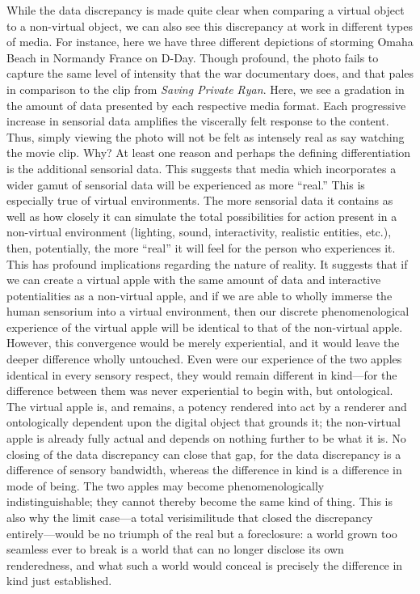 \documentclass{article}
\begin{document}
While the data discrepancy is made quite clear when comparing a virtual object to a non-virtual object, we can also see this discrepancy at work in different types of media. For instance, here we have three different depictions of storming Omaha Beach in Normandy France on D-Day. Though profound, the photo fails to capture the same level of intensity that the war documentary does, and that pales in comparison to the clip from \textit{Saving Private Ryan}. Here, we see a gradation in the amount of data presented by each respective media format. Each progressive increase in sensorial data amplifies the viscerally felt response to the content. Thus, simply viewing the photo will not be felt as intensely real as say watching the movie clip. Why? At least one reason and perhaps the defining differentiation is the additional sensorial data. This suggests that media which incorporates a wider gamut of sensorial data will be experienced as more ``real.'' This is especially true of virtual environments. The more sensorial data it contains as well as how closely it can simulate the total possibilities for action present in a non-virtual environment (lighting, sound, interactivity, realistic entities, etc.), then, potentially, the more ``real'' it will feel for the person who experiences it. This has profound implications regarding the nature of reality. It suggests that if we can create a virtual apple with the same amount of data and interactive potentialities as a non-virtual apple, and if we are able to wholly immerse the human sensorium into a virtual environment, then our discrete phenomenological experience of the virtual apple will be identical to that of the non-virtual apple. However, this convergence would be merely experiential, and it would leave the deeper difference wholly untouched. Even were our experience of the two apples identical in every sensory respect, they would remain different in kind—for the difference between them was never experiential to begin with, but ontological. The virtual apple is, and remains, a potency rendered into act by a renderer and ontologically dependent upon the digital object that grounds it; the non-virtual apple is already fully actual and depends on nothing further to be what it is. No closing of the data discrepancy can close that gap, for the data discrepancy is a difference of sensory bandwidth, whereas the difference in kind is a difference in mode of being. The two apples may become phenomenologically indistinguishable; they cannot thereby become the same kind of thing. This is also why the limit case—a total verisimilitude that closed the discrepancy entirely—would be no triumph of the real but a foreclosure: a world grown too seamless ever to break is a world that can no longer disclose its own renderedness, and what such a world would conceal is precisely the difference in kind just established.
\end{document}
